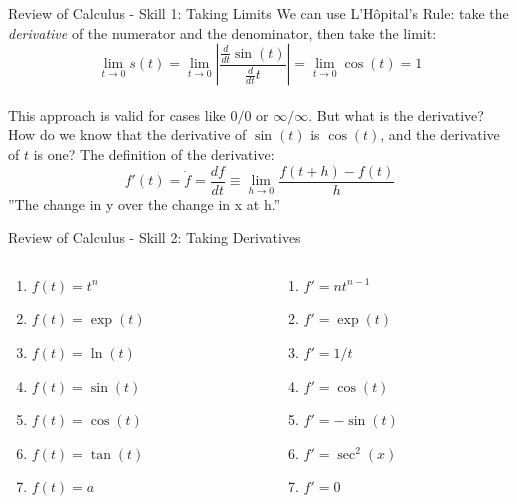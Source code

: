 \documentclass{beamer}
\begin{document}
\begin{frame}{Review of Calculus - Skill 1: Taking Limits}
We can use \alert{L'H\^{o}pital's Rule}: take the \textit{derivative} of the numerator and the denominator, then take the limit: \\
\begin{equation}
\lim_{t\to 0} s(t)  = \lim_{t\to 0} \left| \frac{\frac{d}{dt}\sin(t)}{\frac{d}{dt}t}\right| = \lim_{t\to 0} \cos(t) = 1
\end{equation} \\
This approach is valid for cases like $0/0$ or $\infty/\infty$.  But what is the \alert{derivative}?  How do we know that the derivative of $\sin(t)$ is $\cos(t)$, and the derivative of $t$ is one? The definition of the derivative:
\begin{equation}
f'(t) = \dot{f} = \frac{df}{dt} \equiv \lim_{h \to 0} \frac{f(t+h) - f(t)}{h}
\end{equation}
''The change in y over the change in x at h.''
\end{frame}

\begin{frame}{Review of Calculus - Skill 2: Taking Derivatives}
\begin{columns}[T]
\begin{column}{0.5\textwidth}
\begin{enumerate}
\item $f(t) = t^n$
\item $f(t) = \exp(t)$
\item $f(t) = \ln(t)$
\item $f(t) = \sin(t)$
\item $f(t) = \cos(t)$
\item $f(t) = \tan(t)$
\item $f(t) = a$
\end{enumerate}
\end{column}
\begin{column}{0.5\textwidth}
\begin{enumerate}
\item $f' = nt^{n-1}$
\item $f' = \exp(t)$
\item $f' = 1/t$
\item $f' = \cos(t)$
\item $f' = -\sin(t)$
\item $f' = \sec^2(x)$
\item $f' = 0$
\end{enumerate}
\end{column}
\end{columns}
\end{frame}
\end{document}
